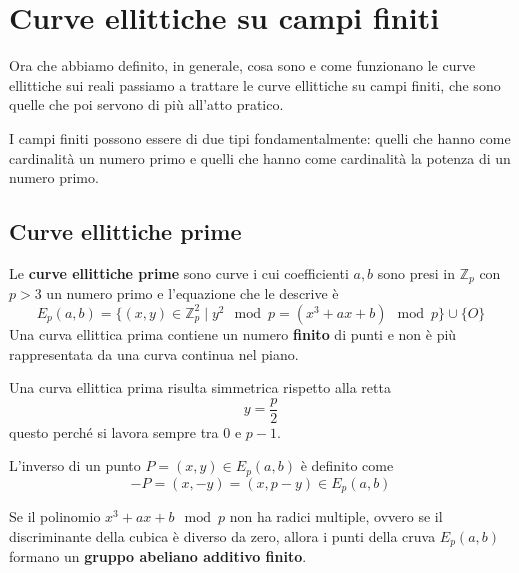 \section{Curve ellittiche su campi finiti}
Ora che abbiamo definito, in generale, cosa sono e come funzionano le curve ellittiche sui reali passiamo a trattare
le curve ellittiche su campi finiti, che sono quelle che poi servono di pi\`u all'atto pratico.

I campi finiti possono essere di due tipi fondamentalmente: quelli che hanno come cardinalit\`a un numero primo e
quelli che hanno come cardinalit\`a la potenza di un numero primo.

\subsection{Curve ellittiche prime}
Le \textbf{curve ellittiche prime} sono curve i cui coefficienti $a, b$ sono presi in $\mathbb{Z}_p$ con $p > 3$
un numero primo e l'equazione che le descrive \`e
\[ E_p(a, b) = 	\{ (x, y) \in \mathbb{Z}_p^2 \mid y^2 \mod{p} = (x^3 + ax + b) \mod{p} \} \cup \{ O \} \]
Una curva ellittica prima contiene un numero \textbf{finito} di punti e non \`e pi\`u rappresentata da una curva
continua nel piano.

Una curva ellittica prima risulta simmetrica rispetto alla retta
\[ y = \frac{p}{2} \]
questo perch\'e si lavora sempre tra 0 e $p - 1$.

L'inverso di un punto $P = (x, y) \in E_p(a, b)$ \`e definito come
\[ -P = (x, -y) = (x, p - y) \in E_p(a, b) \]

Se il polinomio $x^3 + ax + b \mod{p}$ non ha radici multiple, ovvero se il discriminante della cubica \`e diverso
da zero, allora i punti della cruva $E_p(a, b)$ formano un \textbf{gruppo abeliano additivo finito}.

